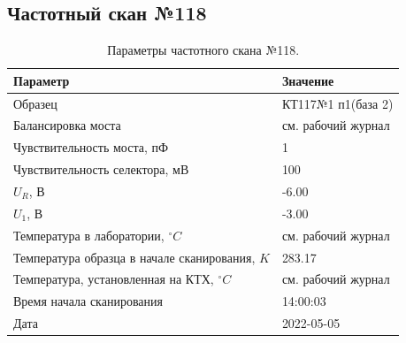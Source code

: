 \subsection{Частотный скан №118}
\begin{table}[!ht]
    \centering
    \caption{Параметры частотного скана №118.}
    \begin{tabular}{|l|l|}
        \hline
        Параметр                                       & Значение                  \\ \hline
        Образец                                        & КТ117№1 п1(база 2)        \\ \hline
        Балансировка моста                             & см. рабочий журнал        \\ \hline
        Чувствительность моста, пФ                     & 1                         \\ \hline
        Чувствительность селектора, мВ                 & 100                       \\ \hline
        $U_R$, В                                       & -6.00                     \\ \hline
        $U_1$, В                                       & -3.00                     \\ \hline
        Температура в лаборатории, $^\circ C$          & см. рабочий журнал        \\ \hline
        Температура образца в начале сканирования, $K$ & 283.17                    \\ \hline
        Температура, установленная на КТХ, $^\circ C$  & см. рабочий журнал        \\ \hline
        Время начала сканирования                      & 14:00:03                  \\ \hline
        Дата                                           & 2022-05-05                \\ \hline
    \end{tabular}
    \label{table:frequency_scan_118}
\end{table}

